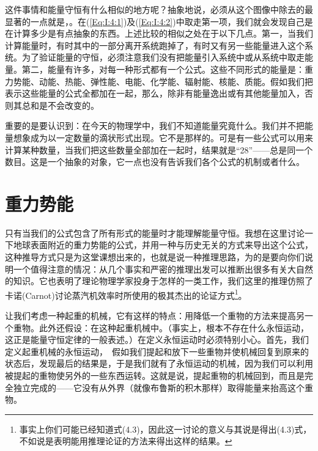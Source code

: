 \documentclass[12pt,oneside]{book}
\begin{document}
这件事情和能量守恒有什么相似的地方呢？抽象地说，必须从这个图像中除去的最显著的一点就是，。在(\ref{Eq:I:4:1})及(\ref{Eq:I:4:2})中取走第一项，我们就会发现自己是在计算多少是有点抽象的东西。上述比较的相似之处在于以下几点。第一，当我们计算能量时，有时其中的一部分离开系统跑掉了，有时又有另一些能量进入这个系统。为了验证能量的守恒，必须注意我们没有把能量引入系统中或从系统中取走能量。第二，能量有许多，对每一种形式都有一个公式。这些不同形式的能量是：重力势能、动能、热能、弹性能、电能、化学能、辐射能、核能、质能。假如我们把表示这些能量的公式全都加在一起，那么，除非有能量逸出或有其他能量加入，否则其总和是不会改变的。

重要的是要认识到：在今天的物理学中，我们不知道能量究竟什么。我们并不把能量想象成为以一定数量的滴状形式出现。它不是那样的。可是有一些公式可以用来计算某种数量，当我们把这些数量全部加在一起时，结果就是“28”——总是同一个数目。这是一个抽象的对象，它一点也没有告诉我们各个公式的机制或者什么。


\section{重力势能}
只有当我们的公式包含了所有形式的能量时才能理解能量守恒。我想在这里讨论一下地球表面附近的重力势能的公式，并用一种与历史无关的方式来导出这个公式，这种推导方式只是为这堂课想出来的，也就是说一种推理思路，为的是要向你们说明一个值得注意的情况：从几个事实和严密的推理出发可以推断出很多有关大自然的知识。它也表明了理论物理学家投身于怎样的一类工作，我们这里的推理仿照了卡诺(Carnot)讨论蒸汽机效率时所使用的极其杰出的论证方式\footnote{事实上你们可能已经知道式(4.3)，因此这一讨论的意义与其说是得出(4.3)式，不如说是表明能用推理论证的方法来得出这样的结果。}。

让我们考虑一种起重的机械，它有这样的特点：用降低一个重物的方法来提高另一个重物。此外还假设：在这种起重机械中。（事实上，根本不存在什么永恒运动，这正是能量守恒定律的一般表述。）在定义永恒运动时必须特别小心。首先，我们定义起重机械的永恒运动，　假如我们提起和放下一些重物并使机械回复到原来的状态后，发现最后的结果是，于是我们就有了永恒运动的机械，因为我们可以利用被提起的重物使另外的一些东西运转。这就是说，提起重物的机械回到，而且是完全独立完成的——它没有从外界（就像布鲁斯的积木那样）取得能量来抬高这个重物。
\end{document}
